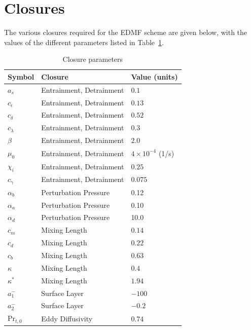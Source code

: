 \documentclass{report}
\begin{document}
\section{Closures} \label{sec:Closures}
The various closures required for the EDMF scheme are given below, with the values of the different parameters listed in Table~\ref{table:parameters}.

\begin{table}[htbp]
\caption{Closure parameters}
\label{table:parameters}
\centering
\begin{tabular}{lll}
\hline 
Symbol & Closure & Value (units)\\
\hline 
$a_{s}$ & Entrainment, Detrainment &   $0.1$ \\
$c_{\epsilon}$ & Entrainment, Detrainment &  $0.13$ \\
$c_{\delta}$ & Entrainment, Detrainment &  $0.52$ \\
$c_{\lambda}$ & Entrainment, Detrainment &  $0.3$ \\
$\beta$ & Entrainment, Detrainment &  $2.0$\\
$\mu_0$ & Entrainment, Detrainment &  $ 4 \times 10^{-4}$  (1/s) \\
$\chi_{i}$ & Entrainment, Detrainment & $ 0.25 $\\
$c_{\gamma}$ & Entrainment, Detrainment & $ 0.075 $\\
$\alpha_b$ & Perturbation Pressure &  0.12 \\
$\alpha_a$ & Perturbation Pressure & 0.10 \\
$\alpha_d$ & Perturbation Pressure & 10.0 \\
$c_m$ & Mixing Length & $0.14$ \\
$c_{d}$ & Mixing Length &  $0.22$ \\
$c_{b}$ & Mixing Length &  $0.63$ \\
$\kappa$ & Mixing Length &  $0.4$ \\
$\kappa^*$ & Mixing Length & $1.94$ \\
$a_1^-$ & Surface Layer & $-100$ \\
$a_2^-$ & Surface Layer & $-0.2$\\
$\mathrm{Pr}_{t,0}$ & Eddy Diffusivity & $0.74$\\
\hline 
\end{tabular}
\end{table}
\end{document}
